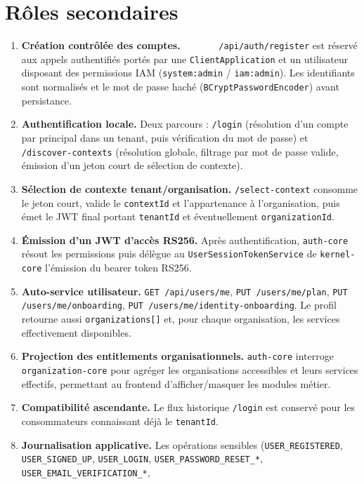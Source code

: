 \documentclass[11pt,a4paper,oneside]{report}
\newcommand{\code}[1]{\texttt{\small #1}}
\newcommand{\httppost}{\textcolor{white}{\colorbox{green!45!black}{\scriptsize\ttfamily\,POST\,}}}
\begin{document}
\section{Rôles secondaires}
\begin{enumerate}[leftmargin=1.6em,itemsep=2pt]
  \item \textbf{Création contrôlée des comptes.} \httppost~\code{/api/auth/register} est
  réservé aux appels authentifiés portés par une \code{ClientApplication} et un utilisateur
  disposant des permissions IAM (\code{system:admin} / \code{iam:admin}). Les identifiants
  sont normalisés et le mot de passe haché (\code{BCryptPasswordEncoder}) avant persistance.
  \item \textbf{Authentification locale.} Deux parcours : \code{/login} (résolution d'un
  compte par principal dans un tenant, puis vérification du mot de passe) et
  \code{/discover-contexts} (résolution globale, filtrage par mot de passe valide, émission
  d'un jeton court de sélection de contexte).
  \item \textbf{Sélection de contexte tenant/organisation.} \code{/select-context} consomme
  le jeton court, valide le \code{contextId} et l'appartenance à l'organisation, puis émet le
  JWT final portant \code{tenantId} et éventuellement \code{organizationId}.
  \item \textbf{Émission d'un JWT d'accès RS256.} Après authentification, \code{auth-core}
  résout les permissions puis délègue au \code{UserSessionTokenService} de \code{kernel-core}
  l'émission du bearer token RS256.
  \item \textbf{Auto-service utilisateur.} \code{GET /api/users/me}, \code{PUT
  /users/me/plan}, \code{PUT /users/me/onboarding}, \code{PUT /users/me/identity-onboarding}.
  Le profil retourne aussi \code{organizations[]} et, pour chaque organisation, les services
  effectivement disponibles.
  \item \textbf{Projection des entitlements organisationnels.} \code{auth-core} interroge
  \code{organization-core} pour agréger les organisations accessibles et leurs services
  effectifs, permettant au frontend d'afficher/masquer les modules métier.
  \item \textbf{Compatibilité ascendante.} Le flux historique \code{/login} est conservé pour
  les consommateurs connaissant déjà le \code{tenantId}.
  \item \textbf{Journalisation applicative.} Les opérations sensibles
  (\code{USER\_REGISTERED}, \code{USER\_SIGNED\_UP}, \code{USER\_LOGIN},
  \code{USER\_PASSWORD\_RESET\_*}, \code{USER\_EMAIL\_VERIFICATION\_*},

\end{enumerate}
\end{document}
